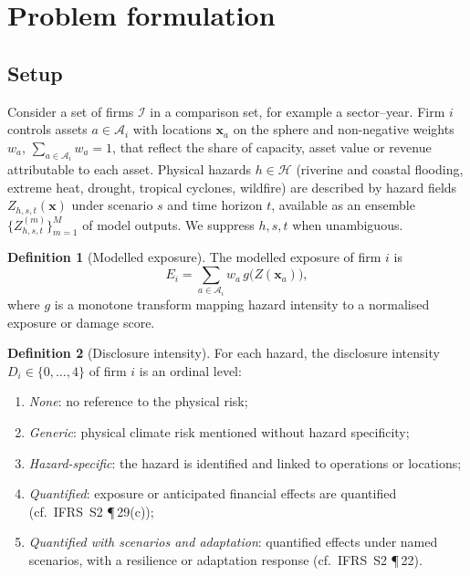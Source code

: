 \documentclass{article}
\theoremstyle{plain}
\theoremstyle{definition}
\newtheorem{definition}{Definition}
\newcommand{\x}{\mathbf{x}}
\begin{document}
\section{Problem formulation}
\label{sec:problem}

\subsection{Setup}
Consider a set of firms $\mathcal{I}$ in a comparison set, for example a sector--year. Firm $i$ controls assets $a\in\mathcal{A}_i$ with locations $\x_a$ on the sphere and non-negative weights $w_a$, $\sum_{a\in\mathcal{A}_i} w_a = 1$, that reflect the share of capacity, asset value or revenue attributable to each asset. Physical hazards $h\in\mathcal{H}$ (riverine and coastal flooding, extreme heat, drought, tropical cyclones, wildfire) are described by hazard fields $Z_{h,s,t}(\x)$ under scenario $s$ and time horizon $t$, available as an ensemble $\{Z^{(m)}_{h,s,t}\}_{m=1}^{M}$ of model outputs. We suppress $h,s,t$ when unambiguous.

\begin{definition}[Modelled exposure]
The modelled exposure of firm $i$ is
\begin{equation}
  E_i = \sum_{a\in\mathcal{A}_i} w_a\, g\big(Z(\x_a)\big),
  \label{eq:exposure}
\end{equation}
where $g$ is a monotone transform mapping hazard intensity to a normalised exposure or damage score.
\end{definition}

\begin{definition}[Disclosure intensity]
For each hazard, the disclosure intensity $D_i\in\{0,\dots,4\}$ of firm $i$ is an ordinal level:
\begin{enumerate}[label=\arabic*., start=0, leftmargin=1.8em]
  \item \emph{None}: no reference to the physical risk;
  \item \emph{Generic}: physical climate risk mentioned without hazard specificity;
  \item \emph{Hazard-specific}: the hazard is identified and linked to operations or locations;
  \item \emph{Quantified}: exposure or anticipated financial effects are quantified (cf.\ IFRS~S2 \P\,29(c));
  \item \emph{Quantified with scenarios and adaptation}: quantified effects under named scenarios, with a resilience or adaptation response (cf.\ IFRS~S2 \P\,22).
\end{enumerate}
\end{definition}
\end{document}
